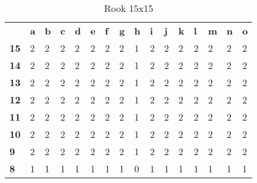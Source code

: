 \documentclass{article}
\begin{document}
\begin{table}[H]
\centering
\caption{Rook 15x15}
\label{my-label}
\begin{tabular}{llllllllllllllll}
                                 & \textbf{a} & \textbf{b} & \textbf{c} & \textbf{d} & \textbf{e} & \textbf{f} & \textbf{g} & \textbf{h} & \textbf{i} & \textbf{j} & \textbf{k} & \textbf{l} & \textbf{m} & \textbf{n} & \textbf{o} \\ \cline{2-16} 
\multicolumn{1}{l|}{\textbf{15}} & 2          & 2          & 2          & 2          & 2          & 2          & 2          & 1          & 2          & 2          & 2          & 2          & 2          & 2          & 2          \\
\multicolumn{1}{l|}{\textbf{14}} & 2          & 2          & 2          & 2          & 2          & 2          & 2          & 1          & 2          & 2          & 2          & 2          & 2          & 2          & 2          \\
\multicolumn{1}{l|}{\textbf{13}} & 2          & 2          & 2          & 2          & 2          & 2          & 2          & 1          & 2          & 2          & 2          & 2          & 2          & 2          & 2          \\
\multicolumn{1}{l|}{\textbf{12}} & 2          & 2          & 2          & 2          & 2          & 2          & 2          & 1          & 2          & 2          & 2          & 2          & 2          & 2          & 2          \\
\multicolumn{1}{l|}{\textbf{11}} & 2          & 2          & 2          & 2          & 2          & 2          & 2          & 1          & 2          & 2          & 2          & 2          & 2          & 2          & 2          \\
\multicolumn{1}{l|}{\textbf{10}} & 2          & 2          & 2          & 2          & 2          & 2          & 2          & 1          & 2          & 2          & 2          & 2          & 2          & 2          & 2          \\
\multicolumn{1}{l|}{\textbf{9}}  & 2          & 2          & 2          & 2          & 2          & 2          & 2          & 1          & 2          & 2          & 2          & 2          & 2          & 2          & 2          \\
\multicolumn{1}{l|}{\textbf{8}}  & 1          & 1          & 1          & 1          & 1          & 1          & 1          & 0          & 1          & 1          & 1          & 1          & 1          & 1          & 1          \\

\end{tabular}
\end{table}
\end{document}
